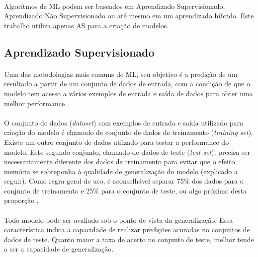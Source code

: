 \paragraph{} Algoritmos de ML podem ser baseados em Aprendizado Supervisionado, Aprendizado Não Supervisionado ou até mesmo em um aprendizado híbrido. Este trabalho utiliza apenas AS para a criação de modelos.



\FloatBarrier
\subsection{Aprendizado Supervisionado}

\paragraph{} Uma das metodologias mais comuns de ML, seu objetivo é a predição de um resultado a partir de um conjunto de dados de entrada, com a condição de que o modelo tem acesso a vários exemplos de entrada e saída de dados para obter uma melhor performance \cite{muller2016introduction}.

\paragraph{} O conjunto de dados (\textit{dataset}) com exemplos de entrada e saída utilizado para criação do modelo é chamado de conjunto de dados de treinamento (\textit{training set}). Existe um outro conjunto de dados utilzado para testar a performance do modelo. Este segundo conjunto, chamado de dados de teste (\textit{test set}), precisa ser necessariamente diferente dos dados de treinamento para evitar que o efeito memória se sobreponha à qualidade de generalização do modelo (explicado a seguir). Como regra geral de uso, é aconselhável separar 75\% dos dados para o conjunto de treinamento e 25\% para o conjunto de teste, ou algo próximo desta proporção \cite{muller2016introduction}.

\paragraph{} Todo modelo pode ser avaliado sob o ponto de vista da generalização. Essa característica indica a capacidade de realizar predições acuradas no conjuntos de dados de teste. Quanto maior a taxa de acerto no conjunto de teste, melhor tende a ser a capacidade de generalização.

